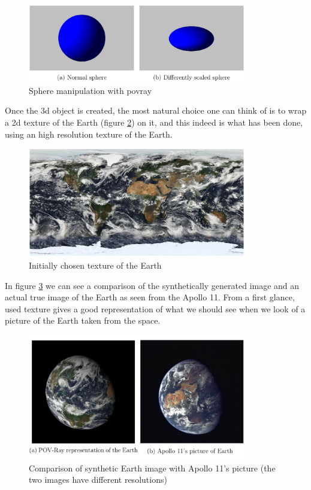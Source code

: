 \begin{figure}[htbp]
  \centering
  \includegraphics[width=0.85\textwidth]{gfx/sphere_scaling.eps}
  \caption{Sphere manipulation with \acrshort{povray} \cite{jacopo}}
  \label{fig:spherescaling}
\end{figure}

Once the \acrshort{3d} object is created, the most natural choice one can think of is to wrap a \acrshort{2d} texture of the Earth (figure \ref{fig:firstTexture}) on it, and this indeed is what has been done, using an high resolution texture of the Earth.

\begin{figure}[htbp]
  \centering
  \includegraphics[width=0.85\textwidth]{gfx/first_text.eps}
  \caption{Initially chosen texture of the Earth}
  \label{fig:firstTexture}
\end{figure}

\bigskip

In figure \ref{fig:EarthApollo} we can see a comparison of the synthetically generated image and an actual true image of the Earth as seen from the Apollo 11. From a first glance, used texture gives a good representation of what we should see when we look of a picture of the Earth taken from the space.

\begin{figure}[htbp]
  \centering
  \includegraphics[width=0.85\textwidth]{gfx/earthApolloOurs.eps}
  \caption{Comparison of synthetic Earth image with Apollo 11's picture (the two images have different resolutions)}
  \label{fig:EarthApollo}
\end{figure}

